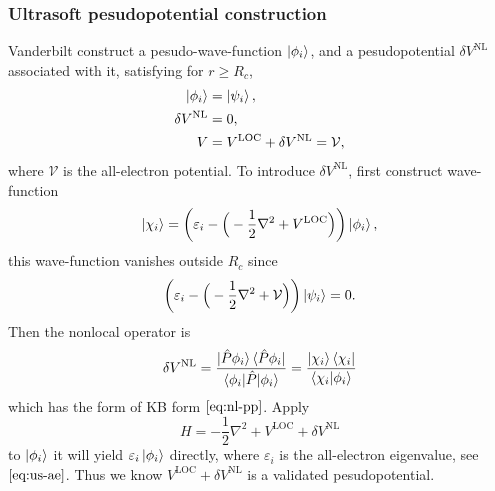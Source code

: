 
\subsubsection{Ultrasoft pesudopotential construction}
\label{sssec:us}

Vanderbilt\cite{Vanderbilt:1990is} construct a pesudo-wave-function $\ket{ \phi_i }$, and a
pesudopotential $\delta V^\text{NL}$ associated with it,
satisfying for $r \ge R_c$,
\begin{align}
	\ket{ \phi_i }     & = \ket{ \psi_i },                                  \\
	\delta V^\text{NL} & = 0,                                               \\
	V                  & = V^\text{LOC} + \delta V^\text{NL} = \mathcal{V},
\end{align}
where $\mathcal{V}$ is the all-electron potential.
To introduce $\delta V^\text{NL}$, first construct wave-function
\begin{equation}
	\ket{ \chi_i } = \bigg( \varepsilon_i -
	\Big( - \frac{ 1 }{ 2 } \nabla^2 + V^\text{LOC} \Big)
	\bigg) \ket{ \phi_i },
\end{equation}
this wave-function vanishes outside $R_c$ since
\begin{equation}\label{eq:us-ae}
	\bigg( \varepsilon_i -
	\Big( - \frac{ 1 }{ 2 } \nabla^2 + \mathcal{V} \Big)
	\bigg) \ket{ \psi_i } = 0.
\end{equation}
Then the nonlocal operator is
\begin{equation}\label{eq:us-pp}
	\delta V^\text{NL} = \frac{ \ket{\hat{P} \phi_i } \bra{ \hat{P} \phi_i }}{
		\braket{ \phi_i | \hat{P} | \phi_i } }
	=
	\frac{ \ket{ \chi_i } \bra{ \chi_i } }{
		\braket{ \chi_i | \phi_i }
	}
\end{equation}
which has the form of KB form $\eqref{eq:nl-pp}$.
Apply
\begin{equation}
	H =  - \frac{ 1 }{ 2 } \nabla^2 + V^\text{LOC} + \delta V^\text{NL}
\end{equation}
to $\ket{ \phi_i }$ it will yield $\varepsilon_i \ket{ \phi_i }$ directly,
where $\varepsilon_i$ is the all-electron eigenvalue, see $\eqref{eq:us-ae}$.
Thus we know $V^\text{LOC} + \delta V^\text{NL}$ is a validated
pesudopotential.